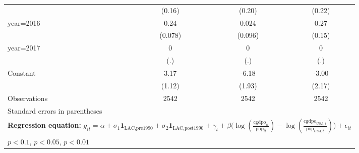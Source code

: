 \begin{sidewaystable}[htbp]
\begin{tabular}{l*{3}{c}}
                &   (0.16)         &   (0.20)         &   (0.22)         \\
\addlinespace
year=2016       &     0.24\sym{***}&    0.024         &     0.27\sym{*}  \\
                &  (0.078)         &  (0.096)         &   (0.15)         \\
\addlinespace
year=2017       &        0         &        0         &        0         \\
                &      (.)         &      (.)         &      (.)         \\
\addlinespace
Constant        &     3.17\sym{***}&    -6.18\sym{***}&    -3.00         \\
                &   (1.12)         &   (1.93)         &   (2.17)         \\
\midrule
Observations    &     2542         &     2542         &     2542         \\
\bottomrule
\multicolumn{4}{l}{\footnotesize Standard errors in parentheses}\\
\multicolumn{4}{l}{\footnotesize \textbf{Regression equation:} \(g_{it} = \alpha + \sigma_1 \mathbf{1}_{\textrm{LAC,pre1990}} + \sigma_2 \mathbf{1}_{\textrm{LAC,post1990}} + \gamma_t + \beta \big(\log (\frac{\textrm{cgdpo}_{it}}{\textrm{pop}_{it}} ) - \log (\frac{\textrm{cgdpo}_{USA,t}}{\textrm{pop}_{USA,t}}  ) \big) + \epsilon_{it}\)}\\
\multicolumn{4}{l}{\footnotesize \sym{*} \(p<0.1\), \sym{**} \(p<0.05\), \sym{***} \(p<0.01\)}\\
\end{tabular}
\end{sidewaystable}
